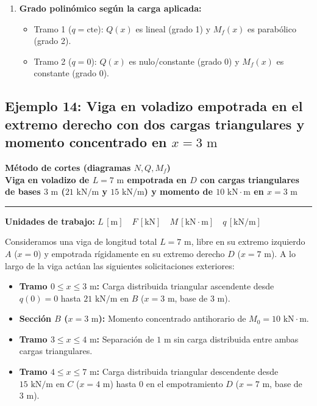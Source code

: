 {\begin{enumerate}
        \item \textbf{Grado polinómico según la carga aplicada:}
              \begin{itemize}
                  \item Tramo 1 ($q = \text{cte}$): $Q(x)$ es lineal (grado 1) y $M_f(x)$ es parabólico (grado 2).
                  \item Tramo 2 ($q = 0$): $Q(x)$ es nulo/constante (grado 0) y $M_f(x)$ es constante (grado 0).
              \end{itemize}
    \end{enumerate}
}

\subsection{Ejemplo 14: Viga en voladizo empotrada en el extremo derecho con dos cargas triangulares y momento concentrado en \texorpdfstring{$x = 3\text{ m}$}{x = 3 m}}

\begin{tcolorbox}[colback=blue!3!white, colframe=blue!40!black, arc=3pt, boxrule=0.8pt, left=8pt, right=8pt, top=6pt, bottom=6pt]
    \centering
    {\Large\bfseries\color{blue!60!black} Método de cortes (diagramas $N, Q, M_f$)}\\[2pt]
    {\normalsize\bfseries Viga en voladizo de $L = 7\text{ m}$ empotrada en $D$ con cargas triangulares de bases $3\text{ m}$ ($21\text{ kN/m}$ y $15\text{ kN/m}$) y momento de $10\text{ kN}\cdot\text{m}$ en $x = 3\text{ m}$}

    \vspace{4pt}\hrule\vspace{4pt}
    {\small\textbf{Unidades de trabajo:} $L\,[\text{m}] \quad F\,[\text{kN}] \quad M\,[\text{kN}\cdot\text{m}] \quad q\,[\text{kN/m}]$}
\end{tcolorbox}


Consideramos una viga de longitud total $L = 7\text{ m}$, libre en su extremo izquierdo $A$ ($x = 0$) y empotrada rígidamente en su extremo derecho $D$ ($x = 7\text{ m}$). A lo largo de la viga actúan las siguientes solicitaciones exteriores:
\begin{itemize}
    \item \textbf{Tramo $0 \le x \le 3\text{ m}$:} Carga distribuida triangular ascendente desde $q(0) = 0$ hasta $21\text{ kN/m}$ en $B$ ($x = 3\text{ m}$, base de $3\text{ m}$).
    \item \textbf{Sección $B$ ($x = 3\text{ m}$):} Momento concentrado antihorario de $M_0 = 10\text{ kN}\cdot\text{m}$.
    \item \textbf{Tramo $3 \le x \le 4\text{ m}$:} Separación de $1\text{ m}$ sin carga distribuida entre ambas cargas triangulares.
    \item \textbf{Tramo $4 \le x \le 7\text{ m}$:} Carga distribuida triangular descendente desde $15\text{ kN/m}$ en $C$ ($x = 4\text{ m}$) hasta $0$ en el empotramiento $D$ ($x = 7\text{ m}$, base de $3\text{ m}$).
\end{itemize}

